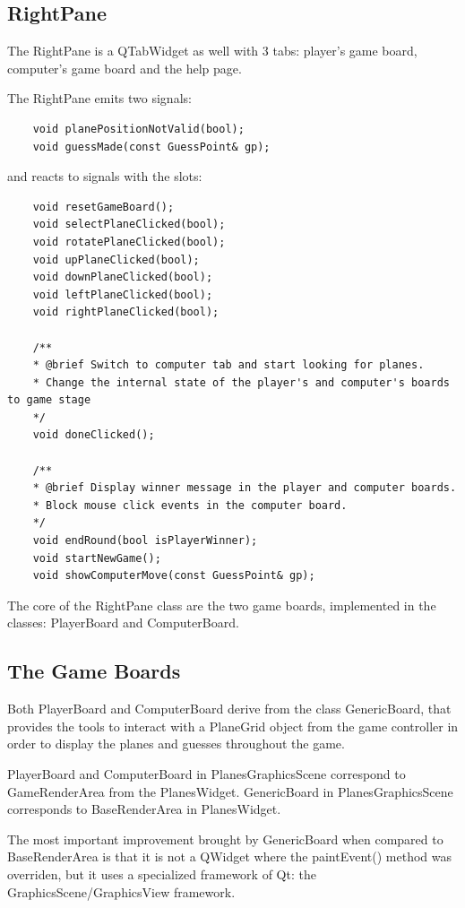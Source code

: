 \subsection{RightPane}

The RightPane is a QTabWidget as well with 3 tabs: player's game board, computer's game board and the help page.

The RightPane emits two signals:

\begin{lstlisting}
	void planePositionNotValid(bool);
	void guessMade(const GuessPoint& gp);
\end{lstlisting}

and reacts to signals with the slots:

\begin{lstlisting}
    void resetGameBoard();
	void selectPlaneClicked(bool);
	void rotatePlaneClicked(bool);
	void upPlaneClicked(bool);
	void downPlaneClicked(bool);
	void leftPlaneClicked(bool);
	void rightPlaneClicked(bool);

	/**
	* @brief Switch to computer tab and start looking for planes.
	* Change the internal state of the player's and computer's boards to game stage
	*/
	void doneClicked();
	
	/**
	* @brief Display winner message in the player and computer boards.
	* Block mouse click events in the computer board.
	*/
	void endRound(bool isPlayerWinner);
	void startNewGame();
	void showComputerMove(const GuessPoint& gp);
\end{lstlisting}

The core of the RightPane class are the two game boards, implemented in the classes: PlayerBoard and ComputerBoard.

\subsection{The Game Boards}

Both PlayerBoard and ComputerBoard derive from the class GenericBoard, that provides the tools to interact with a PlaneGrid object from the game controller in order to display the planes and guesses throughout the game.

PlayerBoard and ComputerBoard in PlanesGraphicsScene correspond to GameRenderArea from the PlanesWidget. GenericBoard in PlanesGraphicsScene corresponds to BaseRenderArea in PlanesWidget.

The most important improvement brought by GenericBoard when compared to BaseRenderArea is that it is not a QWidget where the paintEvent() method was overriden, but it uses a specialized framework of Qt: the GraphicsScene/GraphicsView framework.


